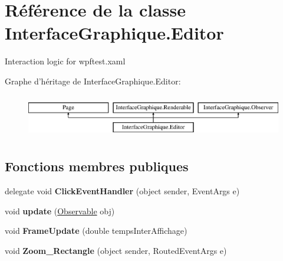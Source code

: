 \hypertarget{class_interface_graphique_1_1_editor}{\section{Référence de la classe Interface\-Graphique.\-Editor}
\label{class_interface_graphique_1_1_editor}
}


Interaction logic for wpftest.\-xaml  


Graphe d'héritage de Interface\-Graphique.\-Editor\-:\begin{figure}[H]
\begin{center}
\leavevmode
\includegraphics[height=1.895093cm]{class_interface_graphique_1_1_editor}
\end{center}
\end{figure}
\subsection*{Fonctions membres publiques}
\begin{DoxyCompactItemize}
\item 
\hypertarget{class_interface_graphique_1_1_editor_add671582e88cc312606ff0cd8647d9f6}{delegate void {\bfseries Click\-Event\-Handler} (object sender, Event\-Args e)}\label{class_interface_graphique_1_1_editor_add671582e88cc312606ff0cd8647d9f6}

\item 
\hypertarget{class_interface_graphique_1_1_editor_ae52bb385a07fb55faa21d9edf2706114}{void {\bfseries update} (\hyperlink{interface_interface_graphique_1_1_observable}{Observable} obj)}\label{class_interface_graphique_1_1_editor_ae52bb385a07fb55faa21d9edf2706114}

\item 
\hypertarget{class_interface_graphique_1_1_editor_af9417f24c0cfdcbad45e3b0d97556bb3}{void {\bfseries Frame\-Update} (double temps\-Inter\-Affichage)}\label{class_interface_graphique_1_1_editor_af9417f24c0cfdcbad45e3b0d97556bb3}

\item 
\hypertarget{class_interface_graphique_1_1_editor_a725d9e2a16dd2806082660391d9035d4}{void {\bfseries Zoom\-\_\-\-Rectangle} (object sender, Routed\-Event\-Args e)}\label{class_interface_graphique_1_1_editor_a725d9e2a16dd2806082660391d9035d4}

\end{DoxyCompactItemize}
